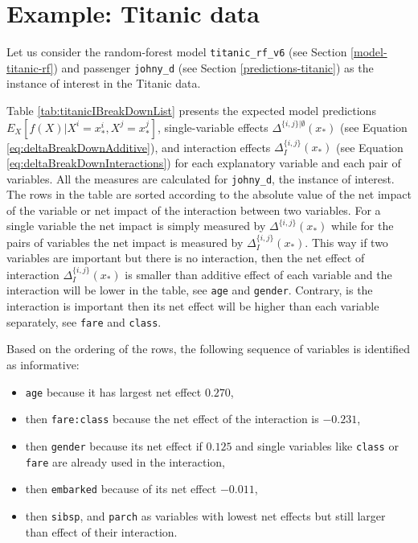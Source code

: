\documentclass[]{krantz}
\providecommand{\tightlist}{%
  \setlength{\itemsep}{0pt}\setlength{\parskip}{0pt}}
\begin{document}
\hypertarget{iBDExample}{%
\section{Example: Titanic data}\label{iBDExample}}

Let us consider the random-forest model \texttt{titanic\_rf\_v6} (see Section \ref{model-titanic-rf}) and passenger \texttt{johny\_d} (see Section \ref{predictions-titanic}) as the instance of interest in the Titanic data.

Table \ref{tab:titanicIBreakDownList} presents the expected model predictions \(E_X[f(X)|X^i = x_*^i, X^j = x_*^j]\), single-variable effects \(\Delta^{\{i,j\}|\emptyset}(x_*)\) (see Equation \eqref{eq:deltaBreakDownAdditive}), and interaction effects \(\Delta_{I}^{\{i,j\}}(x_*)\) (see Equation \eqref{eq:deltaBreakDownInteractions}) for each explanatory variable and each pair of variables. All the measures are calculated for \texttt{johny\_d}, the instance of interest.
The rows in the table are sorted according to the absolute value of the net impact of the variable or net impact of the interaction between two variables. For a single variable the net impact is simply measured by \(\Delta^{\{i,j\}}(x_*)\) while for the pairs of variables the net impact is measured by \(\Delta_{I}^{\{i,j\}}(x_*)\). This way if two variables are important but there is no interaction, then the net effect of interaction \(\Delta_{I}^{\{i,j\}}(x_*)\) is smaller than additive effect of each variable and the interaction will be lower in the table, see \texttt{age} and \texttt{gender}. Contrary, is the interaction is important then its net effect will be higher than each variable separately, see \texttt{fare} and \texttt{class}.

Based on the ordering of the rows, the following sequence of variables is identified as informative:

\begin{itemize}
\tightlist
\item
  \texttt{age} because it has largest net effect \(0.270\),
\item
  then \texttt{fare:class} because the net effect of the interaction is \(-0.231\),
\item
  then \texttt{gender} because its net effect if \(0.125\) and single variables like \texttt{class} or \texttt{fare} are already used in the interaction,
\item
  then \texttt{embarked} because of its net effect \(-0.011\),
\item
  then \texttt{sibsp}, and \texttt{parch} as variables with lowest net effects but still larger than effect of their interaction.
\end{itemize}
\end{document}
